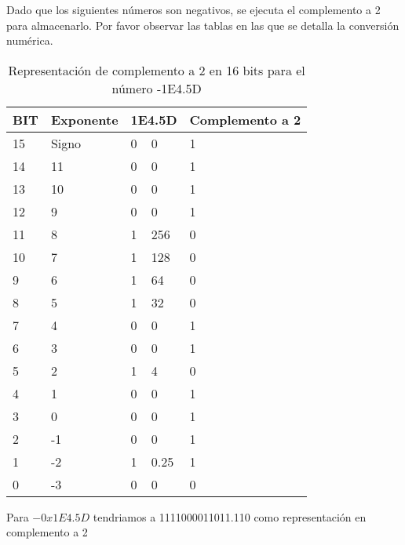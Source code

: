 \documentclass[stu, 12pt, letterpaper, donotrepeattitle, floatsintext, natbib]{apa7}
\begin{document}
Dado que los siguientes números son negativos, se ejecuta el complemento a 2 para almacenarlo. Por favor observar las tablas en las que se detalla la conversión numérica.

\begin{table}[]
\caption{Representación de complemento a 2 en 16 bits para el número -1E4.5D}
\begin{tabular}{|l|l|ll|l|}
\hline
BIT & Exponente & \multicolumn{2}{l|}{1E4.5D}   & Complemento a 2 \\ \hline
15  & Signo     & \multicolumn{1}{l|}{0} & 0    & 1               \\ \hline
14  & 11        & \multicolumn{1}{l|}{0} & 0    & 1               \\ \hline
13  & 10        & \multicolumn{1}{l|}{0} & 0    & 1               \\ \hline
12  & 9         & \multicolumn{1}{l|}{0} & 0    & 1               \\ \hline
11  & 8         & \multicolumn{1}{l|}{1} & 256  & 0               \\ \hline
10  & 7         & \multicolumn{1}{l|}{1} & 128  & 0               \\ \hline
9   & 6         & \multicolumn{1}{l|}{1} & 64   & 0               \\ \hline
8   & 5         & \multicolumn{1}{l|}{1} & 32   & 0               \\ \hline
7   & 4         & \multicolumn{1}{l|}{0} & 0    & 1               \\ \hline
6   & 3         & \multicolumn{1}{l|}{0} & 0    & 1               \\ \hline
5   & 2         & \multicolumn{1}{l|}{1} & 4    & 0               \\ \hline
4   & 1         & \multicolumn{1}{l|}{0} & 0    & 1               \\ \hline
3   & 0         & \multicolumn{1}{l|}{0} & 0    & 1               \\ \hline
2   & -1        & \multicolumn{1}{l|}{0} & 0    & 1               \\ \hline
1   & -2        & \multicolumn{1}{l|}{1} & 0.25 & 1               \\ \hline
0   & -3        & \multicolumn{1}{l|}{0} & 0    & 0               \\ \hline
\end{tabular}
\end{table}

Para $-0x1E4.5D$ tendriamos a 1111000011011.110 como representación en complemento a 2
\end{document}
